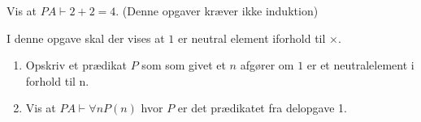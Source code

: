 \ifx\preampleIncluded\undefined
\def\startOpgaverPeano{}


\fi
\begin{opg}
    Vis at $PA \vdash 2+2 = 4$. (Denne opgaver kræver ikke induktion)
\end{opg}
\begin{opg}
    I denne opgave skal der vises at $1$ er neutral element iforhold til $\times$.
    \begin{enumerate}
        \item Opskriv et prædikat $P$ som som givet et $n$ afgører om $1$ er et neutralelement i forhold til n.
        \item Vis at $PA \vdash \forall n P(n)$ hvor $P$ er det prædikatet fra delopgave 1.
    \end{enumerate}
\end{opg}

\ifdefined\startOpgaverPeano\fi
